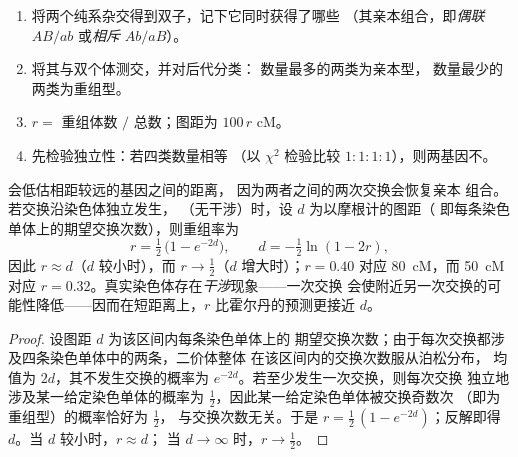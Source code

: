 \begin{method}[定位两个连锁基因]\label{met:b2:meiosis-heredity:twopoint}
\begin{enumerate}
  \item 将两个纯系杂交得到双子，记下它同时获得了哪些
        （其亲本组合，即\emph{偶联}
        $AB/ab$ 或\emph{相斥} $Ab/aB$）。
  \item 将其与双个体测交，并对后代分类：
        数量最多的两类为亲本型，
        数量最少的两类为重组型。
  \item $r = $ 重组体数 $/$ 总数；图距为 $100\,r$ cM。
  \item 先检验独立性：若四类数量相等
        （以 $\chi^2$ 检验比较 $1 : 1 : 1 : 1$），则两基因不。
\end{enumerate}
\end{method}

\begin{theorem}[霍尔丹作图函数]\label{thm:b2:meiosis-heredity:haldane}
会低估相距较远的基因之间的距离，
因为两者之间的两次交换会恢复亲本
组合。若交换沿染色体独立发生，
（无干涉）时，设 $d$ 为以摩根计的图距（
即每条染色单体上的期望交换次数），则重组率为
\[
r = \tfrac12\,\bigl(1 - e^{-2d}\bigr), \qquad d = -\tfrac12\ln(1 - 2r),
\]
因此 $r \approx d$（$d$ 较小时），而 $r \to \tfrac12$（$d$
增大时）；$r = 0.40$ 对应 \qty{80}{cM}，而 \qty{50}{cM}
对应 $r = 0.32$。真实染色体存在\emph{干涉}现象——一次交换
会使附近另一次交换的可能性降低——因而在短距离上，$r$
比霍尔丹的预测更接近 $d$。
\end{theorem}
\begin{proof}
设图距 $d$ 为该区间内每条染色单体上的
期望交换次数；由于每次交换都涉及四条染色单体中的两条，二价体整体
在该区间内的交换次数服从泊松分布，
均值为 $2d$，其不发生交换的概率为
$e^{-2d}$。若至少发生一次交换，则每次交换
独立地涉及某一给定染色单体的概率为
$\tfrac12$，因此某一给定染色单体被交换奇数次
（即为重组型）的概率恰好为 $\tfrac12$，
与交换次数无关。于是 $r = \tfrac12\,(1 -
e^{-2d})$；反解即得 $d$。当 $d$ 较小时，$r \approx d$；
当 $d \to \infty$ 时，$r \to \tfrac12$。
\end{proof}

